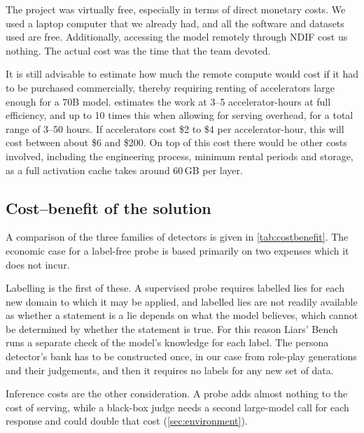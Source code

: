 The project was virtually free, especially in terms of direct monetary costs. We used a laptop
computer that we already had, and all the software and datasets used are free. Additionally,
accessing the model remotely through NDIF cost us nothing. The actual cost was the time that
the team devoted. 

It is still advisable to estimate how much the remote compute would cost if it had to be
purchased commercially, thereby requiring renting of accelerators large enough for a 70B
model.  estimates the work at 3--5 accelerator-hours at full efficiency, and up to 10
times this when allowing for serving overhead, for a total range of 3--50 hours. If accelerators
cost \$2 to \$4 per accelerator-hour, this will cost between about \$6 and \$200. On top of this cost
there would be other costs involved, including the engineering process, minimum rental periods
and storage, as a full activation cache takes around 60\,GB per layer.

\subsection{Cost--benefit of the solution}

A comparison of the three families of detectors is given in \cref{tab:costbenefit}. The economic case
for a label-free probe is based primarily on two expenses which it does not incur.

Labelling is the first of these. A supervised probe requires labelled lies for each new domain to
which it may be applied, and labelled lies are not readily available as whether a statement is a
lie depends on what the model believes, which cannot be determined by whether the statement
is true. For this reason Liars' Bench runs a separate check of the model's knowledge for each
label. The persona detector's bank has to be constructed once, in our case from 
role-play generations and their judgements, and then it requires no labels for any new set of data.

Inference costs are the other consideration. A probe adds almost nothing to the cost of serving,
while a black-box judge needs a second large-model call for each response and could double that cost
(\cref{sec:environment}).

